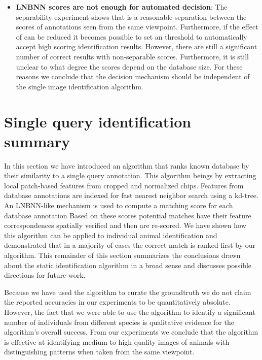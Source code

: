 \begin{itemize}
              \item \textbf{LNBNN scores are not enough for automated decision}:
                The separability experiment shows that is a reasonable
                  separation between the scores of annotations seen from
                  the same viewpoint.
                Furthermore, if the effect of \photobombings{} can be
                  reduced it becomes possible to set an threshold to
                  automatically accept high scoring identification
                  results.
                However, there are still a significant number of
                  correct results with non-separable scores.
                Furthermore, it is still unclear to what degree the
                  scores depend on the database size.
                For these reasons we conclude that the decision
                  mechanism should be independent of the single image
                  identification algorithm.
        \end{itemize}


\section{Single query identification summary}\label{sec:staticsum}

    In this section we have introduced an algorithm that ranks known
      database \names{} by their similarity to a single query annotation.
    This algorithm beings by extracting local patch-based features from
      cropped and normalized chips.
    Features from database annotations are indexed for fast nearest
      neighbor search using a kd-tree.
    An LNBNN-like mechanism is used to compute a matching score for
      each database annotation Based on these scores potential matches
      have their feature correspondences spatially verified and then are
      re-scored.
    We have shown how this algorithm can be applied to individual
      animal identification and demonstrated that in a majority of cases
      the correct match is ranked first by our algorithm.
    This remainder of this section summarizes the conclusions drawn
      about the static identification algorithm in a broad sense and
      discusses possible directions for future work.

    Because we have used the algorithm to curate the groundtruth we do
      not claim the reported accuracies in our experiments to be
      quantitatively absolute.
    However, the fact that we were able to use the algorithm to
      identify a significant number of individuals from different species
      is qualitative evidence for the algorithm's overall success.
    From our experiments we conclude that the algorithm is effective at
      identifying medium to high quality images of animals with
      distinguishing patterns when taken from the same viewpoint.

